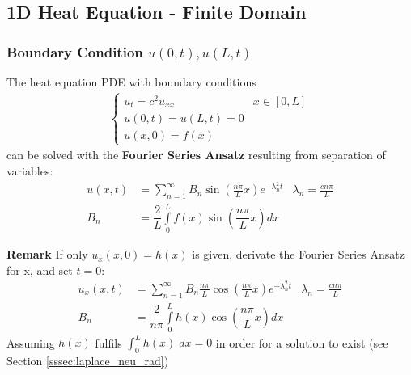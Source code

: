 \subsection{1D Heat Equation - Finite Domain}\label{ssec:1d_heat_fin}
\subsubsection{Boundary Condition \texorpdfstring{$u(0,t), u(L,t)$}{u (0,t), u (L,t)}}
The heat equation PDE with boundary conditions
\begin{align*}
    \begin{cases}
        u_t=c^2u_{xx} & x\in[0,L] \\
        u(0,t)=u(L,t)=0           \\
        u(x,0)=f(x)
    \end{cases}
\end{align*}
can be solved with the \textbf{Fourier Series Ansatz} resulting
from separation of variables:
\begin{align*}
    u(x,t) & =\sum_{n=1}^\infty B_n\sin(\frac{n\pi}Lx)e^{-\lambda_n^2t} & \lambda_n = \frac{cn\pi}{L} \\
    B_n    & =\dfrac{2}{L}\int\limits_0^{L}f(x)\sin(\dfrac{n\pi}{L}x)dx
\end{align*}

\textbf{Remark} If only $u_x(x,0)=h(x)$ is given, derivate the Fourier Series Ansatz for x, and set $t=0$:
\begin{align*}
    u_x(x,t) & =\sum_{n=1}^\infty B_n \frac{n\pi}L\cos(\frac{n\pi}Lx)e^{-\lambda_n^2t} & \lambda_n = \frac{cn\pi}{L} \\
    B_n      & =\dfrac{2}{n\pi}\int\limits_0^{L}h(x)\cos(\dfrac{n\pi}{L}x)dx
\end{align*}
Assuming $h(x)$ fulfils $\int_{0}^{L}h(x)\;dx = 0$ in order for a solution to exist (see Section \ref{sssec:laplace_neu_rad})

